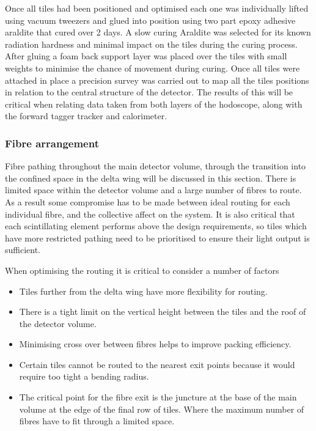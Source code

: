 Once all tiles had been positioned and optimised each one was individually lifted using vacuum tweezers and glued into position using two part epoxy adhesive araldite that cured over 2 days. A slow curing Araldite was selected for its known radiation hardness and minimal impact on the tiles during the curing process. After gluing a foam back support layer was placed over the tiles with small weights to minimise the chance of movement during curing. Once all tiles were attached in place a precision survey was carried out to map all the tiles positions in relation to the central structure of the detector. The results of this will be critical when relating data taken from both layers of the hodoscope, along with the forward tagger tracker and calorimeter.


\subsubsection*{Fibre arrangement}
	
Fibre pathing throughout the main detector volume, through the transition into the confined space in the delta wing will be discussed in this section. There is limited space within the detector volume and a large number of fibres to route. As a result some compromise has to be made between ideal routing for each individual fibre, and the collective affect on the system. It is also critical that each scintillating element performs above the design requirements, so tiles which have more restricted pathing need to be prioritised to ensure their light output is sufficient.
		
When optimising the routing it is critical to consider a number of factors
	
\begin{itemize}
	\item Tiles further from the delta wing have more flexibility for routing.  
	\item There is a tight limit on the vertical height between the tiles and the roof of the detector volume. 
	\item Minimising cross over between fibres helps to improve packing efficiency.
	\item Certain tiles cannot be routed to the nearest exit points because it would require too tight a bending radius.
	\item The critical point for the fibre exit is the juncture at the base of the main volume at the edge of the final row of tiles. Where the maximum number of fibres have to fit through a limited space. 
\end{itemize}
		
